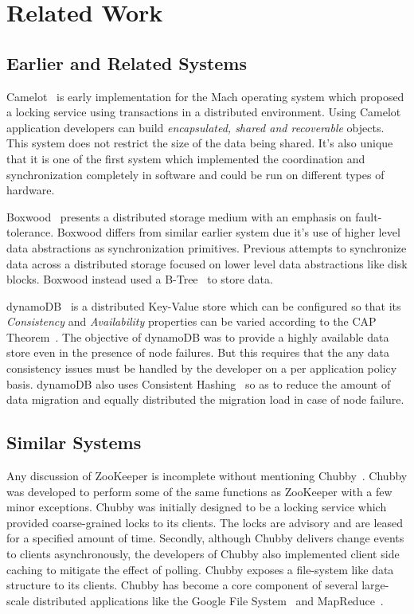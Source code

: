 \chapter{Related Work}
\section{Earlier and Related Systems}
Camelot~\cite{hastings1990distributed} is early implementation for the Mach operating system which proposed a locking service using transactions in a distributed environment. Using Camelot application developers can build \textit{encapsulated, shared and recoverable} objects. This system does not restrict the size of the data being shared. It's also unique that it is one of the first system which implemented the coordination and synchronization completely in software and could be run on different types of hardware.

Boxwood~\cite{maccormick2004boxwood} presents a distributed storage medium with an emphasis on fault-tolerance. Boxwood differs from similar earlier system due it's use of higher level data abstractions as synchronization primitives. Previous attempts to synchronize data across a distributed storage focused on lower level data abstractions like disk blocks. Boxwood instead used a B-Tree~\cite{skiena504algorithm} to store data.

dynamoDB~\cite{decandia2007dynamo} is a distributed Key-Value store which can be configured so that its \textit{Consistency} and \textit{Availability} properties can be varied according to the CAP Theorem~\cite{Gilbert:2002:BCF:564585.564601}. The objective of dynamoDB was to provide a highly available data store even in the presence of node failures. But this requires that the any data consistency issues must be handled by the developer on a per application policy basis. dynamoDB also uses Consistent Hashing~\cite{Karger:1997:CHR:258533.258660} so as to reduce the amount of data migration and equally distributed the migration load in case of node failure. 

\section{Similar Systems}
Any discussion of ZooKeeper is incomplete without mentioning Chubby~\cite{burrows2006chubby}. Chubby was developed to perform some of the same functions as ZooKeeper with a few minor exceptions. Chubby was initially designed to be a locking service which provided coarse-grained locks to its clients. The locks are advisory and are leased for a specified amount of time. Secondly, although Chubby delivers change events to clients asynchronously, the developers of Chubby also implemented client side caching to mitigate the effect of polling. Chubby exposes a file-system like data structure to its clients. Chubby has become a core component of several large-scale distributed applications like the Google File System~\cite{Ghemawat:2003:GFS:945445.945450} and MapReduce~\cite{Dean:2008:MSD:1327452.1327492}.


